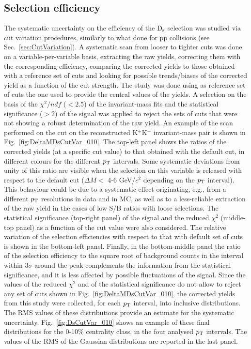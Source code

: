\subsection{Selection efficiency}
\label{sec:CutVarsystAA}
The systematic uncertainty on the efficiency of the ${\rm D_s}$ selection was studied
via cut variation procedures, similarly to what done for pp collisions (see Sec.~\ref{sec:CutVariation}).
A systematic scan from looser to tighter cuts was done on a variable-per-variable 
basis, extracting the raw yields, correcting them with the corresponding efficiency, 
comparing the corrected yields to those obtained 
with a reference set of cuts and looking for possible trends/biases of 
the corrected yield as a function of the cut strength.
The study was done using as reference set of cuts the one used 
to provide the central values of the yields. A selection
on the basis of the $\chi^2/ndf$ ($<2.5$) of the invariant-mass fits and the statistical significance ($>2$)
of the signal was applied to reject the sets of cuts that were not showing a robust 
determination of the raw yield.  
An example of the scan performed on the cut on the
reconstructed K$^+$K$^-$ invariant-mass pair is shown in Fig.~\ref{fig:DeltaMDsCutVar_010}.
The top-left panel shows the ratios of the corrected yields 
(at a specific cut value) to that obtained with the default
cut, in different colours for the different $p_{\rm T}$ intervals.
Some systematic deviations from unity of this ratio are visible when the selection
on this variable is released with respect to the default cut ($\Delta M < $ 4-6 GeV/$c^2$ depending
on the $p_{\rm T}$ interval). 
This behaviour could be due to a systematic effect originating, e.g., from a 
different $p_{\rm T}$ resolutions in data and in MC, as well as to a less-reliable extraction of 
the raw yield in the cases of low S/B ratios with loose selections.
The statistical significance (top-right panel) of the signal and
the reduced $\chi^2$ (middle-top panel) as a function of the cut value were also considered.
The relative variation of the selection
efficiencies with respect to that with default set of cuts is shown in the bottom-left panel.
Finally, in the bottom-middle panel the ratio of the selection efficiency to the square root of 
background counts in the interval within $3\sigma$ around the peak complements 
the information from the statistical significance,
and it is less affected by possible fluctuations of the signal.
Since the values of the reduced $\chi^2$ and of the statistical significance do
not allow to reject any set of cuts shown in Fig.~\ref{fig:DeltaMDsCutVar_010},
the corrected yields from this study were collected, for each $p_{\rm T}$ interval,
into inclusive distributions. The RMS values of these distributions provide an estimate for the systematic uncertainty.
Fig.~\ref{fig:DsCutVar_010} shows an example of these final distributions 
for the 0-10\% centrality class, in the four analysed $p_{\rm T}$ intervals. 
The values of the RMS of the Gaussian distributions are reported
in the last panel.

